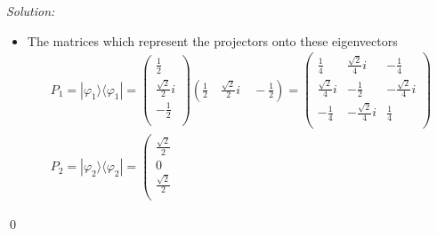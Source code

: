 \documentclass[12pt,a4paper]{article}
\newenvironment{sol}
    {\emph{Solution:}
    }
    {
    \qed
    }
\begin{document}
\begin{sol}
\begin{itemize}
\begin{gather}
\begin{array}{c}
0\\
0\\
\end{array}\right)\\
\Longrightarrow|\varphi_3\rangle=
\left(\begin{array}{c}
c_1\\
c_2\\
c_3\\
\end{array}\right)
=
\left(\begin{array}{c}
\frac{1}{2}\\
-\frac{\sqrt{2}}{2}i\\
-\frac{1}{2}\\
\end{array}\right)
\end{gather}
Rewritein them in terms of the $\{|1\rangle,|2\rangle,|3\rangle\}$ basis
\begin{gather}
|\varphi_1\rangle=\frac{1}{2}|1\rangle+\frac{\sqrt{2}}{2}i|2\rangle-\frac{1}{2}|3\rangle\\
|\varphi_2\rangle=\frac{\sqrt{2}}{2}|1\rangle+\frac{\sqrt{2}}{2}|3\rangle\\
|\varphi_3\rangle=\frac{1}{2}|1\rangle-\frac{\sqrt{2}}{2}i|2\rangle-\frac{1}{2}|3\rangle
\end{gather}
\item[(b)] The matrices which represent the projectors onto these eigenvectors
\begin{gather}
P_1=|\varphi_1\rangle\langle\varphi_1|=
\left(\begin{array}{c}
\frac{1}{2}\\
\frac{\sqrt{2}}{2}i\\
-\frac{1}{2}\\
\end{array}\right)
(\frac{1}{2}\quad\frac{\sqrt{2}}{2}i\quad-\frac{1}{2})
=
\left(\begin{array}{ccc}
\frac{1}{4}&\frac{\sqrt{2}}{4}i&-\frac{1}{4}\\
\frac{\sqrt{2}}{4}i&-\frac{1}{2}&-\frac{\sqrt{2}}{4}i\\
-\frac{1}{4}&-\frac{\sqrt{2}}{4}i&\frac{1}{4}\\
\end{array}\right)\\
P_2=|\varphi_2\rangle\langle\varphi_2|=
\left(\begin{array}{c}
\frac{\sqrt{2}}{2}\\
0\\
\frac{\sqrt{2}}{2}\\

\end{array}
\end{gather}
\end{itemize}
\end{sol}
\end{document}
